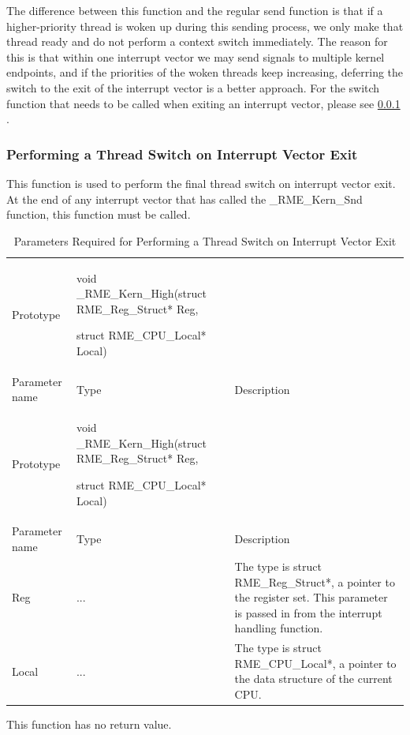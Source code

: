 The difference between this function and the regular send function is that if a higher-priority thread is woken up during this sending process, we only make that thread ready and do not perform a context switch immediately. The reason for this is that within one interrupt vector we may send signals to multiple kernel endpoints, and if the priorities of the woken threads keep increasing, deferring the switch to the exit of the interrupt vector is a better approach. For the switch function that needs to be called when exiting an interrupt vector, please see \ref{subsubsec:7-thread-switch-on-interrupt-vector-exit}
.

\subsubsection{Performing a Thread Switch on Interrupt Vector Exit}\label{subsubsec:7-thread-switch-on-interrupt-vector-exit}

This function is used to perform the final thread switch on interrupt vector exit. At the end of any interrupt vector that has called the \_RME\_Kern\_Snd function, this function must be called.

\begin{xltabular}{\textwidth}{@{}>{\hsize\raggedright\arraybackslash}X>{\hsize\raggedright\arraybackslash}X>{\hsize\raggedright\arraybackslash}X@{}}
\caption{Parameters Required for Performing a Thread Switch on Interrupt Vector Exit}\label{tab:7-27-thread-switch-on-interrupt-vector-exit-parameters}\\
\toprule
Prototype\strut
 & void \_RME\_Kern\_High(struct RME\_Reg\_Struct* Reg,

struct RME\_CPU\_Local* Local)\strut
 & \strut
\tabularnewline
Parameter name & Type & Description\tabularnewline
\endfirsthead
\toprule
Prototype\strut
 & void \_RME\_Kern\_High(struct RME\_Reg\_Struct* Reg,

struct RME\_CPU\_Local* Local)\strut
 & \strut
\tabularnewline
Parameter name & Type & Description\tabularnewline
\midrule
\endhead
\bottomrule
\endlastfoot
Reg & ... & The type is struct
RME\_Reg\_Struct*, a pointer to the register set. This parameter is passed in from the interrupt handling function.\tabularnewline
Local & ... & The type is struct
RME\_CPU\_Local*, a pointer to the data structure of the current CPU.\tabularnewline
\end{xltabular}
\nopagebreak[4]

This function has no return value.

